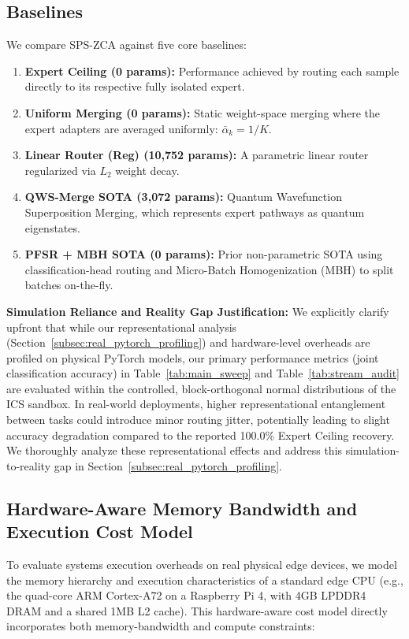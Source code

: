 \subsection{Baselines}
We compare SPS-ZCA against five core baselines:
\begin{enumerate}
    \item \textbf{Expert Ceiling (0 params):} Performance achieved by routing each sample directly to its respective fully isolated expert.
    \item \textbf{Uniform Merging (0 params):} Static weight-space merging where the expert adapters are averaged uniformly: $\bar{\alpha}_k = 1/K$.
    \item \textbf{Linear Router (Reg) (10,752 params):} A parametric linear router regularized via $L_2$ weight decay.
    \item \textbf{QWS-Merge SOTA (3,072 params):} Quantum Wavefunction Superposition Merging, which represents expert pathways as quantum eigenstates.
    \item \textbf{PFSR + MBH SOTA (0 params):} Prior non-parametric SOTA using classification-head routing and Micro-Batch Homogenization (MBH) to split batches on-the-fly.
\end{enumerate}

\textbf{Simulation Reliance and Reality Gap Justification:} We explicitly clarify upfront that while our representational analysis (Section~\ref{subsec:real_pytorch_profiling}) and hardware-level overheads are profiled on physical PyTorch models, our primary performance metrics (joint classification accuracy) in Table~\ref{tab:main_sweep} and Table~\ref{tab:stream_audit} are evaluated within the controlled, block-orthogonal normal distributions of the ICS sandbox.
In real-world deployments, higher representational entanglement between tasks could introduce minor routing jitter, potentially leading to slight accuracy degradation compared to the reported 100.0\% Expert Ceiling recovery.
We thoroughly analyze these representational effects and address this simulation-to-reality gap in Section~\ref{subsec:real_pytorch_profiling}.


\subsection{Hardware-Aware Memory Bandwidth and Execution Cost Model}
\label{subsec:hardware_model}
To evaluate systems execution overheads on real physical edge devices, we model the memory hierarchy and execution characteristics of a standard edge CPU (e.g., the quad-core ARM Cortex-A72 on a Raspberry Pi 4, with 4GB LPDDR4 DRAM and a shared 1MB L2 cache).
This hardware-aware cost model directly incorporates both memory-bandwidth and compute constraints:


